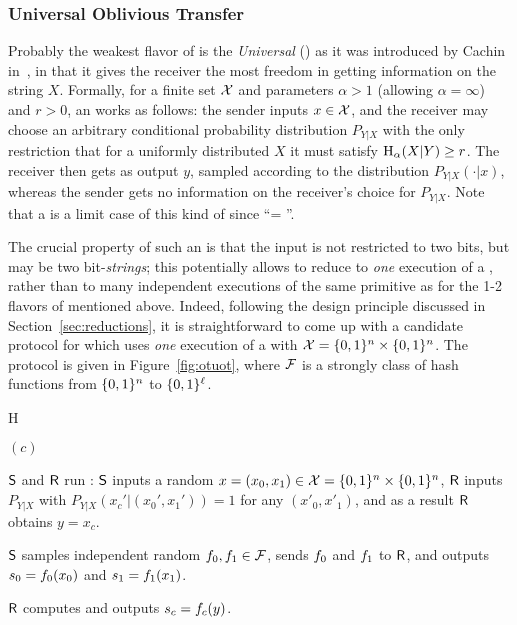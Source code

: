 \subsubsection{Universal Oblivious Transfer}
Probably the weakest flavor of \pOT is the {\em Universal} \pOT 
(\pUOT) as it was introduced by Cachin in~\cite{Cachin98}, in that it gives the
receiver the most freedom in getting information on the string $X$.
Formally, for a finite set $\cX$ and parameters $\alpha > 1$
(allowing $\alpha = \infty$) and $r > 0$, an  works
as follows: the sender inputs $x \in \cX$, and the receiver may choose
an arbitrary conditional probability distribution $P_{Y|X}$ with the
only restriction that for a uniformly distributed $X$ it must satisfy
$\H_{\alpha}(X|Y) \geq r$.
The receiver then gets as output $y$, sampled according to the
distribution $P_{Y|X}(\cdot|x)$, whereas the sender gets no
information on the receiver's choice for $P_{Y|X}$. Note that a \BUOT
is a limit case of this kind of \pUOT since ``\BUOT =
''.

The crucial property of such an \pUOT is that the input is not restricted to two bits, but %
may be two bit-{\em strings}; this potentially allows to reduce \OT 
to {\em one} execution of a \pUOT, rather than to many independent
executions of the same primitive as for the 1-2 flavors of \pOT 
mentioned above. Indeed, following the design principle discussed in
Section~\ref{sec:reductions}, it is straightforward to come up with a
candidate protocol for \lStringOT which uses {\em one} execution
of a  with $\cX = \set{0,1}^n \times \set{0,1}^n$.
The protocol is given in Figure~\ref{fig:otuot}, where $\UH$ is a
strongly \univ class of hash functions from $\set{0,1}^n$ to
$\set{0,1}^{\ell}$.

\begin{myfigure}{H}
 \begin{myprotocol}{\OTUOT$(c)$}
 \item $\S$ and $\R$ run : $\S$ inputs a random $x
   = (x_0,x_1) \in \cX = \set{0,1}^n \times \set{0,1}^n$, $\R$ inputs
   $P_{Y|X}$ with $P_{Y|X}(x_c'|(x_0',x_1')) = 1$ for any
   $(x'_0,x'_1)$, and as a result $\R$ obtains $y = x_c$.
  \item $\S$ samples independent random $\hf_0,\hf_1 \in \UH$, sends $\hf_0$ and $\hf_1$ to $\R$, and outputs $s_0 = \hf_0(x_0)$ and $s_1 = \hf_1(x_1)$. 
  \item $\R$ computes and outputs $s_c = \hf_c(y)$. 
 \end{myprotocol}
\caption{Protocol \OTUOT\ for %
\Rand\lStringOT. }\label{fig:otuot}
\end{myfigure}

